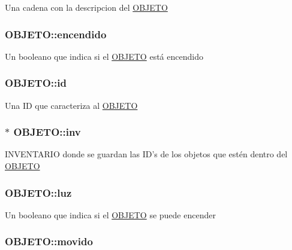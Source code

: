 \label{structOBJETO_afcd768e04fe1a5f48754705249abd2f3}
Una cadena con la descripcion del \hyperlink{structOBJETO}{OBJETO} \hypertarget{structOBJETO_ab086a1ad0cd88575f6b821ac51f565c4}{
\subsubsection[{encendido}]{ {\bf OBJETO::encendido}}}
\label{structOBJETO_ab086a1ad0cd88575f6b821ac51f565c4}
Un booleano que indica si el \hyperlink{structOBJETO}{OBJETO} está encendido \hypertarget{structOBJETO_a39cde9d0235d61bb61547447ee6cde38}{
\subsubsection[{id}]{ {\bf OBJETO::id}}}
\label{structOBJETO_a39cde9d0235d61bb61547447ee6cde38}
Una ID que caracteriza al \hyperlink{structOBJETO}{OBJETO} \hypertarget{structOBJETO_a826a56ca0057306b92282ce8794b5484}{
\subsubsection[{inv}]{$\ast$ {\bf OBJETO::inv}}}
\label{structOBJETO_a826a56ca0057306b92282ce8794b5484}
INVENTARIO donde se guardan las ID's de los objetos que estén dentro del \hyperlink{structOBJETO}{OBJETO} \hypertarget{structOBJETO_a3c8e42fab0378205bbcc451c5712c2d5}{
\subsubsection[{luz}]{ {\bf OBJETO::luz}}}
\label{structOBJETO_a3c8e42fab0378205bbcc451c5712c2d5}
Un booleano que indica si el \hyperlink{structOBJETO}{OBJETO} se puede encender \hypertarget{structOBJETO_a7a534a47dfbee7fb8e61a959f6e0c58c}{
\subsubsection[{movido}]{ {\bf OBJETO::movido}}}
